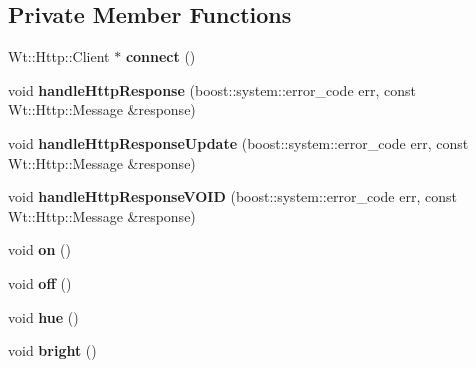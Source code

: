 \subsection*{Private Member Functions}
\begin{DoxyCompactItemize}
\item 
Wt\+::\+Http\+::\+Client $\ast$ {\bfseries connect} ()\hypertarget{classGroupsSchedulerControlWidget_a955faa95f33e54162ab4f0f80a098ec8}{}\label{classGroupsSchedulerControlWidget_a955faa95f33e54162ab4f0f80a098ec8}

\item 
void {\bfseries handle\+Http\+Response} (boost\+::system\+::error\+\_\+code err, const Wt\+::\+Http\+::\+Message \&response)\hypertarget{classGroupsSchedulerControlWidget_a792d4425d72eb99afbed972c0799b273}{}\label{classGroupsSchedulerControlWidget_a792d4425d72eb99afbed972c0799b273}

\item 
void {\bfseries handle\+Http\+Response\+Update} (boost\+::system\+::error\+\_\+code err, const Wt\+::\+Http\+::\+Message \&response)\hypertarget{classGroupsSchedulerControlWidget_a435f968223e3fa849290a500f7dae79f}{}\label{classGroupsSchedulerControlWidget_a435f968223e3fa849290a500f7dae79f}

\item 
void {\bfseries handle\+Http\+Response\+V\+O\+ID} (boost\+::system\+::error\+\_\+code err, const Wt\+::\+Http\+::\+Message \&response)\hypertarget{classGroupsSchedulerControlWidget_aa62abc1e4341919ae6c58a1cc0780051}{}\label{classGroupsSchedulerControlWidget_aa62abc1e4341919ae6c58a1cc0780051}

\item 
void {\bfseries on} ()\hypertarget{classGroupsSchedulerControlWidget_a6851a79e55eb93900d0a9873adf29b96}{}\label{classGroupsSchedulerControlWidget_a6851a79e55eb93900d0a9873adf29b96}

\item 
void {\bfseries off} ()\hypertarget{classGroupsSchedulerControlWidget_a3ab5a7846740af53524a36dbd9de0063}{}\label{classGroupsSchedulerControlWidget_a3ab5a7846740af53524a36dbd9de0063}

\item 
void {\bfseries hue} ()\hypertarget{classGroupsSchedulerControlWidget_a11955a39bb867453921c29c181389f20}{}\label{classGroupsSchedulerControlWidget_a11955a39bb867453921c29c181389f20}

\item 
void {\bfseries bright} ()\hypertarget{classGroupsSchedulerControlWidget_a295debac5e291f952108ef4be62d83bf}{}\label{classGroupsSchedulerControlWidget_a295debac5e291f952108ef4be62d83bf}


\end{DoxyCompactItemize}
